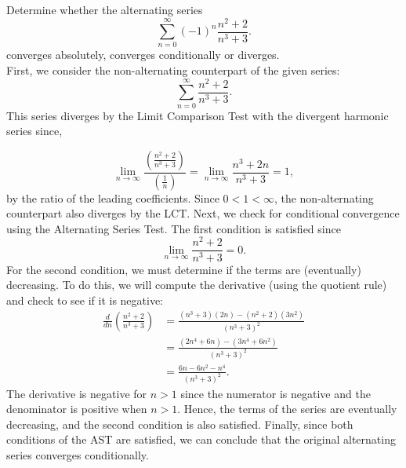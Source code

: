 \documentclass[handout]{ximera}
\begin{document}
\begin{example}[example 4]
Determine whether the alternating series
\[
\sum_{n=0}^\infty (-1)^n \frac{n^2 + 2}{n^3 + 3}.
\]
converges absolutely, converges conditionally or diverges.\\
First, we consider the non-alternating counterpart of the given series:
\[
\sum_{n=0}^\infty \frac{n^2 + 2}{n^3 + 3}.
\]
This series diverges by the Limit Comparison Test with the divergent harmonic series since,

\[
\lim_{n\to\infty} \frac{\left(\frac{n^2 + 2}{n^3 + 3} \right)}{\left(\frac{1}{n} \right)} = \lim_{n\to\infty} \frac{n^3 + 2n}{n^3 + 3} = 1,
\]
by the ratio of the leading coefficients. Since $0 < 1< \infty$, the non-alternating counterpart also diverges by the LCT.
Next, we check for conditional convergence using the Alternating Series Test.
The first condition is satisfied since
\[
\lim_{n\to\infty} \frac{n^2 + 2}{n^3 + 3} = 0.
\]
For the second condition, we must determine if the terms are (eventually) decreasing.  To do this, we will compute the derivative (using the quotient rule) and check to see if it is negative:
\begin{align*}
\frac{d}{dn} \left(\frac{n^2 + 2}{n^3 + 3} \right) &= \frac{(n^3 + 3)(2n) - (n^2 + 2)(3n^2)}{(n^3 + 3)^2}\\
                                                            &= \frac{(2n^4 + 6n)-(3n^4+6n^2)}{(n^3 + 3)^2}\\
                                                            &= \frac{6n - 6n^2 - n^4}{(n^3 + 3)^2}.
\end{align*}
The derivative is negative for $n>1$ since the numerator is negative and the 
denominator is positive when $n>1$.
Hence, the terms of the series are eventually decreasing, and the second 
condition is also satisfied. Finally, since both conditions of the AST are satisfied,
we can conclude that the original alternating series converges conditionally.

\end{example}
\end{document}
